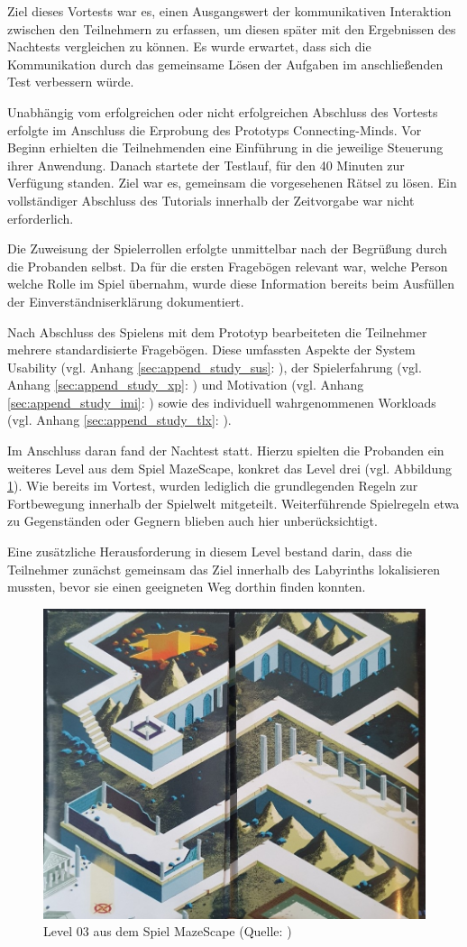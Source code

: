 Ziel dieses Vortests war es, einen Ausgangswert der kommunikativen Interaktion zwischen den Teilnehmern zu erfassen, um diesen später mit den Ergebnissen des Nachtests vergleichen zu können. Es wurde erwartet, dass sich die Kommunikation durch das gemeinsame Lösen der Aufgaben im anschließenden Test verbessern würde.

Unabhängig vom erfolgreichen oder nicht erfolgreichen Abschluss des Vortests erfolgte im Anschluss die Erprobung des Prototyps Connecting-Minds. Vor Beginn erhielten die Teilnehmenden eine Einführung in die jeweilige Steuerung ihrer Anwendung. Danach startete der Testlauf, für den 40 Minuten zur Verfügung standen. Ziel war es, gemeinsam die vorgesehenen Rätsel zu lösen. Ein vollständiger Abschluss des Tutorials innerhalb der Zeitvorgabe war nicht erforderlich.

Die Zuweisung der Spielerrollen erfolgte unmittelbar nach der Begrüßung durch die Probanden selbst. Da für die ersten Fragebögen relevant war, welche Person welche Rolle im Spiel übernahm, wurde diese Information bereits beim Ausfüllen der Einverständniserklärung dokumentiert.

Nach Abschluss des Spielens mit dem Prototyp bearbeiteten die Teilnehmer mehrere standardisierte Fragebögen. Diese umfassten Aspekte der System Usability (vgl. Anhang \ref{sec:append_study_sus}: ), der Spielerfahrung (vgl. Anhang \ref{sec:append_study_xp}: ) und Motivation (vgl. Anhang \ref{sec:append_study_imi}: ) sowie des individuell wahrgenommenen Workloads (vgl. Anhang \ref{sec:append_study_tlx}: ).

Im Anschluss daran fand der Nachtest statt. Hierzu spielten die Probanden ein weiteres Level aus dem Spiel MazeScape, konkret das Level drei (vgl. Abbildung \ref{fig:mazescape_level-03}). Wie bereits im Vortest, wurden lediglich die grundlegenden Regeln zur Fortbewegung innerhalb der Spielwelt mitgeteilt. Weiterführende Spielregeln etwa zu Gegenständen oder Gegnern blieben auch hier unberücksichtigt.

Eine zusätzliche Herausforderung in diesem Level bestand darin, dass die Teilnehmer zunächst gemeinsam das Ziel innerhalb des Labyrinths lokalisieren mussten, bevor sie einen geeigneten Weg dorthin finden konnten.

\begin{figure}[ht]
\centering
\includegraphics[width=0.5\linewidth]{content/pictures/MazeScape_Level03.jpg}
\caption{Level 03 aus dem Spiel MazeScape (Quelle: \citealp{cespedes_mazescape_2023})}
\label{fig:mazescape_level-03}
\end{figure}

